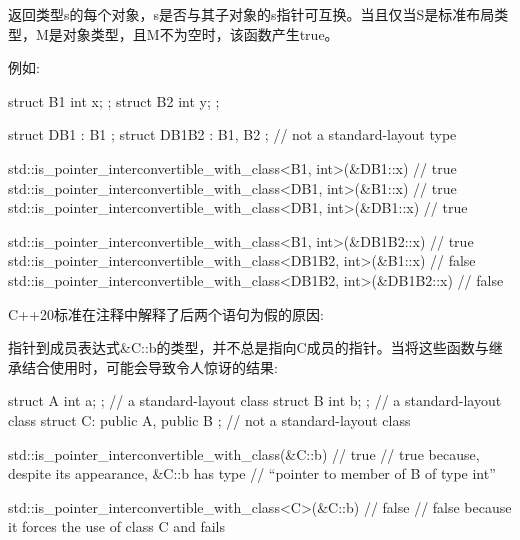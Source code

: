 返回类型s的每个对象，s是否与其子对象的s指针可互换。当且仅当S是标准布局类型，M是对象类型，且M不为空时，该函数产生true。

例如:

\begin{cpp}
struct B1 { int x; };
struct B2 { int y; };

struct DB1 : B1 {};
struct DB1B2 : B1, B2 {}; // not a standard-layout type

std::is_pointer_interconvertible_with_class<B1, int>(&DB1::x) // true
std::is_pointer_interconvertible_with_class<DB1, int>(&B1::x) // true
std::is_pointer_interconvertible_with_class<DB1, int>(&DB1::x) // true

std::is_pointer_interconvertible_with_class<B1, int>(&DB1B2::x) // true
std::is_pointer_interconvertible_with_class<DB1B2, int>(&B1::x) // false
std::is_pointer_interconvertible_with_class<DB1B2, int>(&DB1B2::x) // false
\end{cpp}

C++20标准在注释中解释了后两个语句为假的原因:

指针到成员表达式\&C::b的类型，并不总是指向C成员的指针。当将这些函数与继承结合使用时，可能会导致令人惊讶的结果:

\begin{cpp}
struct A { int a; }; // a standard-layout class
struct B { int b; }; // a standard-layout class
struct C: public A, public B { }; // not a standard-layout class

std::is_pointer_interconvertible_with_class(&C::b) // true
// true because, despite its appearance, &C::b has type
// “pointer to member of B of type int”

std::is_pointer_interconvertible_with_class<C>(&C::b) // false
// false because it forces the use of class C and fails
\end{cpp}






